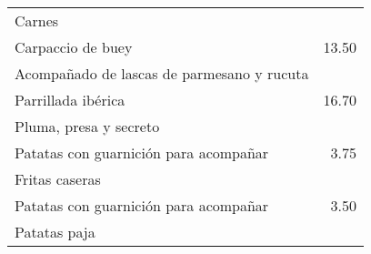 \documentclass[12pt]{article}
\makeatletter
\newcommand*\ColText[1]{\textcolor{Goldenrod3}{#1}}
\newenvironment{Group}[1]
{\noindent\begin{tabular*}{\textwidth}{@{}p{.8\linewidth}@{\extracolsep{\fill}}r@{}}
{\fontsize{24}{29}\selectfont\ColText{#1}}
              \\[0.8em]}
              {
\end{tabular*}}
\newcommand*\Entry[2]{%
    \sffamily#1 & #2}
\newcommand*\Expl[1]{%
    \hspace*{1em}\footnotesize #1}
\makeatother
\begin{document}
    \vfill

    \begin{Group}{Carnes}
        \Entry{Carpaccio de buey}{13.50}                    \\
        \Expl{Acompañado de lascas de parmesano y rucuta}   \\
        \Entry{Parrillada ibérica}{16.70}                   \\
        \Expl{Pluma, presa y secreto}                       \\
        \Entry{Patatas con guarnición para acompañar}{3.75} \\
        \Expl{Fritas caseras}                               \\
        \Entry{Patatas con guarnición para acompañar}{3.50} \\
        \Expl{Patatas paja}                                 \\
    \end{Group}
\end{document}
